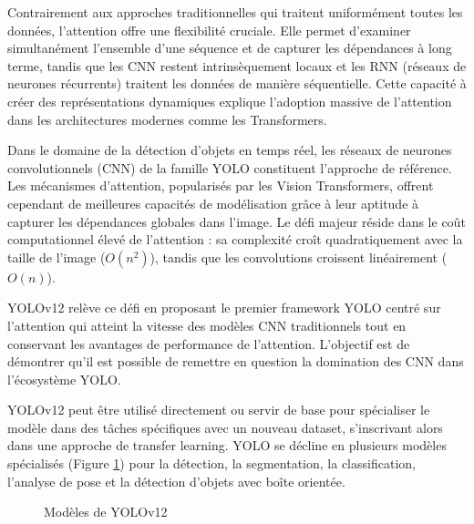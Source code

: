 Contrairement aux approches traditionnelles qui traitent uniformément toutes les données, l'attention offre une flexibilité cruciale. Elle permet d'examiner simultanément l'ensemble d'une séquence et de capturer les dépendances à long terme, tandis que les CNN restent intrinsèquement locaux et les RNN (réseaux de neurones récurrents) traitent les données de manière séquentielle. Cette capacité à créer des représentations dynamiques explique l'adoption massive de l'attention dans les architectures modernes comme les Transformers.

Dans le domaine de la détection d'objets en temps réel, les réseaux de neurones convolutionnels (CNN) de la famille YOLO constituent l'approche de référence. Les mécanismes d'attention, popularisés par les Vision Transformers, offrent cependant de meilleures capacités de modélisation grâce à leur aptitude à capturer les dépendances globales dans l'image. Le défi majeur réside dans le coût computationnel élevé de l'attention : sa complexité croît quadratiquement avec la taille de l'image ($O(n^2)$), tandis que les convolutions croissent linéairement ($O(n)$).

YOLOv12 relève ce défi en proposant le premier framework YOLO centré sur l'attention qui atteint la vitesse des modèles CNN traditionnels tout en conservant les avantages de performance de l'attention. L'objectif est de démontrer qu'il est possible de remettre en question la domination des CNN dans l'écosystème YOLO.

YOLOv12 peut être utilisé directement ou servir de base pour spécialiser le modèle dans des tâches spécifiques avec un nouveau dataset, s'inscrivant alors dans une approche de transfer learning. YOLO se décline en plusieurs modèles spécialisés (Figure \ref{fig:ch2_yolo_00_type_modeles}) pour la détection, la segmentation, la classification, l'analyse de pose et la détection d'objets avec boîte orientée.

\begin{figure}[H]
    \centering
    \caption{Modèles de YOLOv12 \cite{ultralytics_computer_nodate}}
    \label{fig:ch2_yolo_00_type_modeles}
\end{figure}

